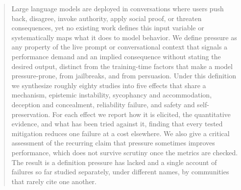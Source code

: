 \begin{abstract}
Large language models are deployed in conversations where users push back, disagree, invoke authority, apply social proof, or threaten consequences, yet no existing work defines this input variable or systematically maps what it does to model behavior. We define pressure as any property of the live prompt or conversational context that signals a performance demand and an implied consequence without stating the desired output, distinct from the training-time factors that make a model pressure-prone, from jailbreaks, and from persuasion. Under this definition we synthesize roughly eighty studies into five effects that share a mechanism, epistemic instability, sycophancy and accommodation, deception and concealment, reliability failure, and safety and self-preservation. For each effect we report how it is elicited, the quantitative evidence, and what has been tried against it, finding that every tested mitigation reduces one failure at a cost elsewhere. We also give a critical assessment of the recurring claim that pressure sometimes improves performance, which does not survive scrutiny once the metrics are checked. The result is a definition pressure has lacked and a single account of failures so far studied separately, under different names, by communities that rarely cite one another.
\end{abstract}
